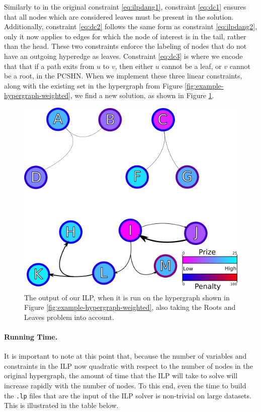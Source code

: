 \documentclass[12pt,twoside]{reedthesis}
\theoremstyle{definition}
\begin{document}
Similarly to in the original constraint \eqref{eq:ilpdang1}, constraint \eqref{eq:dc1} ensures that all nodes which are considered leaves must be present in the solution. Additionally, constraint \eqref{eq:dc2} follows the same form as constraint \eqref{eq:ilpdang2}, only it now applies to edges for which the node of interest is in the tail, rather than the head. These two constraints enforce the labeling of nodes that do not have an outgoing hyperedge as leaves. Constraint \eqref{eq:dc3} is where we encode that that if a path exits from $u$ to $v$, then either $u$ cannot be a leaf, or $v$ cannot be a root, in the PCSHN. When we implement these three linear constraints, along with the existing set in the hypergraph from Figure \ref{fig:example-hypergraph-weighted}, we find a new solution, as shown in Figure \ref{fig:example-hypergraph-weighted_DC}.

\begin{figure}[hp]
  \begin{center}
    \includegraphics[width=\textwidth]{example-hypergraph-weighted_DC}
  \caption[Output from ILP after Roots and Leaves.]{The output of our ILP, when it is run on the hypergraph shown in Figure \ref{fig:example-hypergraph-weighted}, also taking the Roots and Leaves problem into account.}
  \label{fig:example-hypergraph-weighted_DC}
  \end{center}
\end{figure}

\paragraph{Running Time.}It is important to note at this point that, because the number of variables and constraints in the ILP now quadratic with respect to the number of nodes in the original hypergraph, the amount of time that the ILP will take to solve will increase rapidly with the number of nodes. To this end, even the time to build the \texttt{.lp} files that are the input of the ILP solver is non-trivial on large datasets. This is illustrated in the table below.
\end{document}
